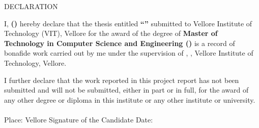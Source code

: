 \centering
\begin{center}
	\Large{DECLARATION}	
\end{center}
\vspace{1em}
\normalsize
 
\begin{flushleft}
\justifying
I, \textbf{\studentname \;(\studentregno)} hereby declare that the thesis entitled \textbf{``\thesistitle''} submitted to Vellore Institute of Technology (VIT), Vellore for the award of the degree of \textbf{Master of Technology in Computer Science and Engineering (\specialization)} is a record of bonafide work carried out by me under the supervision of \textbf{\projsupervisor}, {\projsupervisorschool}, Vellore Institute of Technology, Vellore. \par

I further declare that the work reported in this project report has not been submitted and will not be submitted, either in part or in full, for the award of any other degree or diploma in this institute or any other institute or university.
\end{flushleft}
\paragraph{}
\vspace{5cm}

\noindent Place: Vellore \hspace{8cm} Signature of the Candidate \linebreak
\noindent Date: \thesisdate \hspace{11.5cm} \linebreak
\pagebreak
